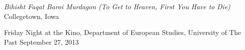 

\vspace{1ex}

\begin{changemargin}{-0.3in}{0in}
\begin{etaremune}
%


\item
\headedsection %
{\textit{Bihisht Faqat Baroi Murdagon (To Get to Heaven, First You
    Have to Die)}}
{Collegetown, Iowa} {

\headedsubsection %
{\textnormal{Friday Night at the Kino, Department of European Studies,
  University of The Past}}
{September 27, 2013}
{\vspace{-0.5\baselineskip}}
}


\end{etaremune}
\end{changemargin}


\spacedhrule{0.5em}{-0.4em} %
